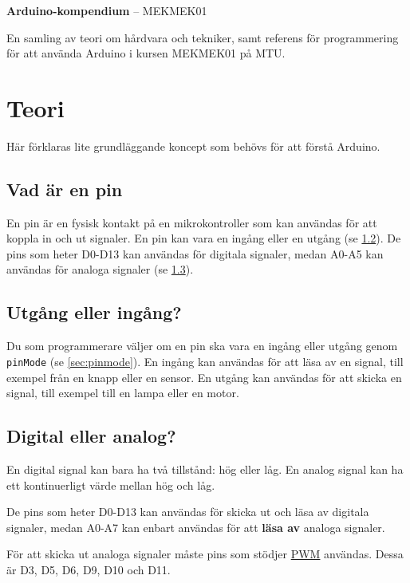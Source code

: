 \documentclass[11pt]{article}
\begin{document}
\raggedright{}
\begin{center}
  \textbf{\huge{Arduino-kompendium}}
  \huge{-- MEKMEK01}
\end{center}

En samling av teori om hårdvara och tekniker, samt referens för programmering
för att använda Arduino i kursen MEKMEK01 på MTU.

\thispagestyle{empty}
\tableofcontents\label{toc}

\newpage

\section{Teori}
Här förklaras lite grundläggande koncept som behövs för att förstå Arduino.

\subsection{Vad är en pin}\label{sec:pin}
En pin är en fysisk kontakt på en mikrokontroller som kan användas för att
koppla in och ut signaler. En pin kan vara en ingång eller en utgång (se
\ref{sec:io}). De pins som heter D0-D13 kan användas för digitala signaler,
medan A0-A5 kan användas för analoga signaler (se \ref{sec:analog-digital}).

\subsection{Utgång eller ingång?}\label{sec:io}
Du som programmerare väljer om en pin ska vara en ingång eller utgång genom
\texttt{pinMode} (se \ref{sec:pinmode}). En ingång kan användas för att läsa av
en signal, till exempel från en knapp eller en sensor. En utgång kan användas
för att skicka en signal, till exempel till en lampa eller en motor.

\subsection{Digital eller analog?}\label{sec:analog-digital}
En digital signal kan bara ha två tillstånd: hög eller låg. En analog signal
kan ha ett kontinuerligt värde mellan hög och låg.

De pins som heter D0-D13 kan användas för skicka ut och läsa av digitala
signaler, medan A0-A7 kan enbart användas för att \textbf{läsa av} analoga
signaler.

För att skicka ut analoga signaler måste pins som stödjer
\hyperref[sec:pwm]{PWM} användas. Dessa är D3, D5, D6, D9, D10 och D11.
\end{document}
